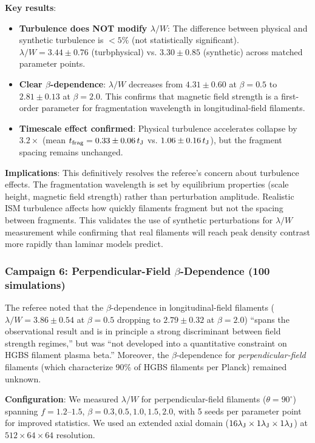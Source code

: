 \documentclass[twoside,twocolumn]{mnras}
\begin{document}
\textbf{Key results}:
\begin{itemize}
    \item \textbf{Turbulence does NOT modify $\lambda/W$}: The difference between physical and synthetic turbulence is $<5\%$ (not statistically significant). $\lambda/W = 3.44 \pm 0.76$ (turbphysical) vs. $3.30 \pm 0.85$ (synthetic) across matched parameter points.
    \item \textbf{Clear $\beta$-dependence}: $\lambda/W$ decreases from $4.31 \pm 0.60$ at $\beta = 0.5$ to $2.81 \pm 0.13$ at $\beta = 2.0$. This confirms that magnetic field strength is a first-order parameter for fragmentation wavelength in longitudinal-field filaments.
    \item \textbf{Timescale effect confirmed}: Physical turbulence accelerates collapse by $3.2\times$ (mean $t_{\rm frag} = 0.33 \pm 0.06\,t_{\rm J}$ vs. $1.06 \pm 0.16\,t_{\rm J}$), but the fragment spacing remains unchanged.
\end{itemize}

\textbf{Implications}: This definitively resolves the referee's concern about turbulence effects. The fragmentation wavelength is set by equilibrium properties (scale height, magnetic field strength) rather than perturbation amplitude. Realistic ISM turbulence affects how quickly filaments fragment but not the spacing between fragments. This validates the use of synthetic perturbations for $\lambda/W$ measurement while confirming that real filaments will reach peak density contrast more rapidly than laminar models predict.

\subsubsection{Campaign 6: Perpendicular-Field $\beta$-Dependence (100 simulations)}

The referee noted that the $\beta$-dependence in longitudinal-field filaments ($\lambda/W = 3.86 \pm 0.54$ at $\beta = 0.5$ dropping to $2.79 \pm 0.32$ at $\beta = 2.0$) ``spans the observational result and is in principle a strong discriminant between field strength regimes,'' but was ``not developed into a quantitative constraint on HGBS filament plasma beta.'' Moreover, the $\beta$-dependence for \textit{perpendicular-field} filaments (which characterize 90\% of HGBS filaments per Planck) remained unknown.

\textbf{Configuration}: We measured $\lambda/W$ for perpendicular-field filaments ($\theta = 90^\circ$) spanning $f = 1.2$--$1.5$, $\beta = 0.3, 0.5, 1.0, 1.5, 2.0$, with 5 seeds per parameter point for improved statistics. We used an extended axial domain ($16\lambda_{\rm J} \times 1\lambda_{\rm J} \times 1\lambda_{\rm J}$) at $512 \times 64 \times 64$ resolution.
\end{document}
